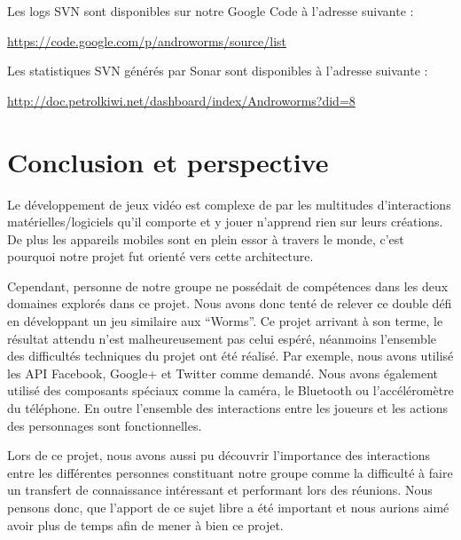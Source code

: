\documentclass{report}
\begin{document}
Les logs SVN sont disponibles sur notre Google Code à l’adresse suivante :

\url{https://code.google.com/p/androworms/source/list}

\bigskip

Les statistiques SVN générés par Sonar sont disponibles à l’adresse suivante :

\url{http://doc.petrolkiwi.net/dashboard/index/Androworms?did=8}


\newpage

\section{Conclusion et perspective}
\bigskip


Le développement de jeux vidéo est complexe de par les multitudes
d'interactions matérielles/logiciels qu’il comporte et y jouer n’apprend
rien sur leurs créations. De plus les appareils mobiles sont en plein
essor à travers le monde, c’est pourquoi notre projet fut orienté vers
cette architecture.

Cependant, personne de notre groupe ne possédait de compétences dans
les deux domaines explorés dans ce projet. Nous avons donc tenté de
relever ce double défi en développant un jeu similaire aux “Worms”.
Ce projet arrivant à son terme, le résultat attendu n’est
malheureusement pas celui espéré, néanmoins l’ensemble des difficultés
techniques du projet ont été réalisé. Par exemple, nous avons utilisé
les API Facebook, Google+ et Twitter comme demandé. Nous avons également
utilisé des composants spéciaux comme la caméra, le Bluetooth ou
l’accéléromètre du téléphone. En outre l’ensemble des interactions entre
les joueurs et les actions des personnages sont fonctionnelles. 

Lors de ce projet, nous avons aussi pu découvrir l’importance des
interactions entre les différentes personnes constituant notre groupe
comme la difficulté à faire un transfert de connaissance intéressant et
performant lors des réunions. Nous pensons donc, que l’apport de ce sujet
libre a été important et nous aurions aimé avoir plus de temps afin de
mener à bien ce projet.
\end{document}

